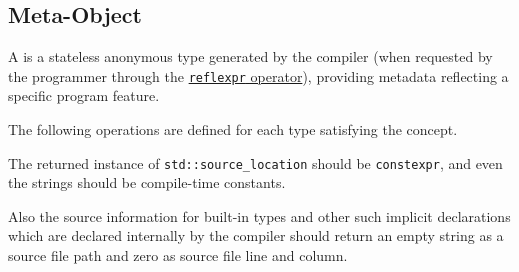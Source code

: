 \subsection{Meta-Object}
\label{concept-Meta-Object}

A  is a stateless anonymous type generated by the compiler
(when requested by the programmer through the 
\hyperref[section-reflection-operator]{\texttt{reflexpr} operator}),
providing metadata reflecting a specific program feature.





The following operations are defined for each type satisfying the 
concept.



The returned instance of \texttt{std::source\_location} should be \texttt{constexpr},
and even the strings should be compile-time constants.

Also the source information for built-in types and other
such implicit declarations which are declared internally by the compiler
should return an empty string as a source file path and zero as source file
line and column.
